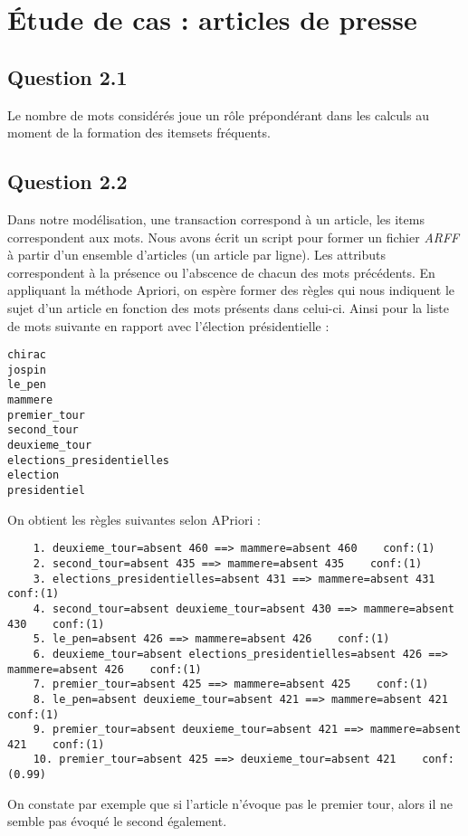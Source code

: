 \documentclass[a4paper,12pt]{article}
\begin{document}
\section{\'Etude de cas : articles de presse}

\subsection*{Question 2.1}

Le nombre de mots considérés joue un rôle prépondérant dans les calculs au moment de la formation des itemsets fréquents.


\subsection*{Question 2.2}

Dans notre modélisation, une transaction correspond à un article, les items correspondent aux mots.
Nous avons écrit un script pour former un fichier \textit{ARFF} à partir d'un ensemble d'articles (un article par ligne).
Les attributs correspondent à la présence ou l'abscence de chacun des mots précédents.
En appliquant la méthode Apriori, on espère former des règles qui nous indiquent le sujet d'un article en fonction des mots présents dans celui-ci.
Ainsi pour la liste de mots suivante en rapport avec l'élection présidentielle :
\begin{lstlisting}
chirac
jospin
le_pen
mammere
premier_tour
second_tour
deuxieme_tour
elections_presidentielles
election
presidentiel
\end{lstlisting}

On obtient les règles suivantes selon APriori :
\begin{lstlisting}
	1. deuxieme_tour=absent 460 ==> mammere=absent 460    conf:(1)
	2. second_tour=absent 435 ==> mammere=absent 435    conf:(1)
	3. elections_presidentielles=absent 431 ==> mammere=absent 431    conf:(1)
	4. second_tour=absent deuxieme_tour=absent 430 ==> mammere=absent 430    conf:(1)
	5. le_pen=absent 426 ==> mammere=absent 426    conf:(1)
	6. deuxieme_tour=absent elections_presidentielles=absent 426 ==> mammere=absent 426    conf:(1)
	7. premier_tour=absent 425 ==> mammere=absent 425    conf:(1)
	8. le_pen=absent deuxieme_tour=absent 421 ==> mammere=absent 421    conf:(1)
	9. premier_tour=absent deuxieme_tour=absent 421 ==> mammere=absent 421    conf:(1)
	10. premier_tour=absent 425 ==> deuxieme_tour=absent 421    conf:(0.99)
\end{lstlisting}

On constate par exemple que si l'article n'évoque pas le premier tour, alors il ne semble pas évoqué le second également.
\end{document}
